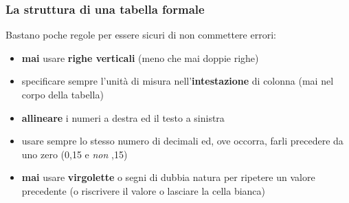 \begin{frame}
  \frametitle{La struttura di una tabella formale}
	Bastano poche regole per essere sicuri di non commettere errori:
  \medskip
	\begin{itemize}
		\item \textbf{mai} usare \textbf{righe verticali} (meno che mai	doppie righe)
		\item specificare sempre l'unit\`a  di misura nell'\textbf{intestazione} di colonna (mai nel corpo della tabella)
		\item \textbf{allineare} i numeri a destra ed il testo a sinistra 
		\item usare sempre lo stesso numero di decimali ed, ove occorra, farli precedere da uno zero (0,15 e \emph{non} ,15)
		\item \textbf{mai} usare \textbf{virgolette} o segni di dubbia natura per ripetere un valore precedente (o riscrivere il valore o lasciare la cella bianca)
	\end{itemize}
\end{frame}
